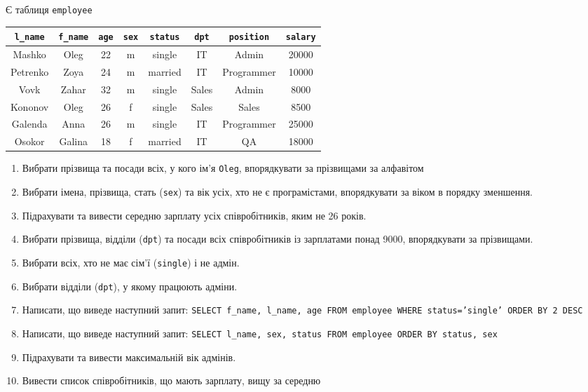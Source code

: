 \documentclass{hw_template}
\begin{document}
\begin{problem}
    Є таблиця \texttt{employee}
    
    \begin{table}[H]
        \centering
        \begin{tabular}{|c|c|c|c|c|c|c|c|}
            \hline
            \texttt{l\_name} & \texttt{f\_name} & \texttt{age} & \texttt{sex} & \texttt{status} & \texttt{dpt} & \texttt{position} & \texttt{salary} \\
            \hline
            Mashko & Oleg & 22 & m & single & IT & Admin & 20000 \\
            Petrenko & Zoya & 24 & m & married & IT & Programmer & 10000 \\
            Vovk & Zahar & 32 & m & single & Sales & Admin & 8000 \\
            Kononov & Oleg & 26 & f & single & Sales & Sales & 8500 \\
            Galenda & Anna & 26 & m & single & IT & Programmer & 25000 \\
            Osokor & Galina & 18 & f & married & IT & QA & 18000 \\
            \hline
        \end{tabular}
    \end{table}

    \begin{enumerate}
    \item Вибрати прізвища та посади всіх, у кого ім'я \texttt{Oleg}, впорядкувати за прізвищами за
    алфавітом
    \item Вибрати імена, прізвища, стать (\texttt{sex}) та вік усіх, хто не є програмістами,
    впорядкувати за віком в порядку зменшення.
    \item Підрахувати та вивести середню зарплату усіх співробітників, яким не 26 років.
    \item Вибрати прізвища, відділи (\texttt{dpt}) та посади всіх співробітників із зарплатами понад
    9000, впорядкувати за прізвищами.
    \item Вибрати всіх, хто не має сім'ї (\texttt{single}) і не адмін.
    \item Вибрати відділи (\texttt{dpt}), у якому працюють адміни.
    \item Написати, що виведе наступний запит:
    \texttt{SELECT f\_name, l\_name, age FROM employee WHERE status='single' ORDER BY 2
    DESC}
    \item Написати, що виведе наступний запит:
    \texttt{SELECT l\_name, sex, status FROM employee ORDER BY status, sex}
    \item Підрахувати та вивести максимальній вік адмінів.
    \item Вивести список співробітників, що мають зарплату, вищу за середню
    \end{enumerate}
\end{problem}
\end{document}
